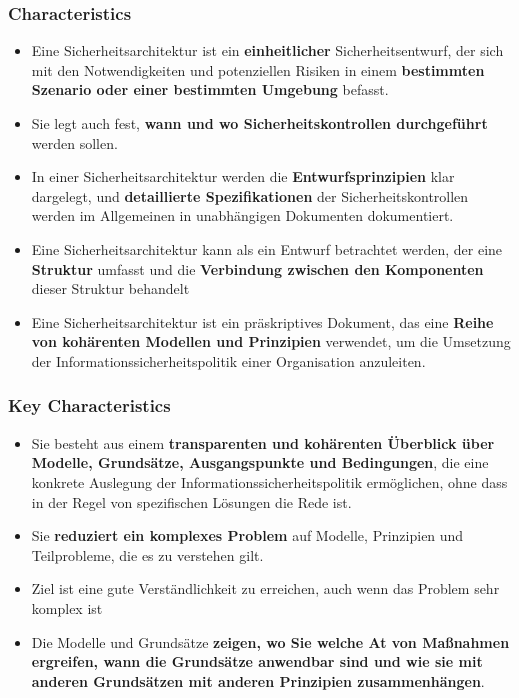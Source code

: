 \subsubsection{Characteristics}
\begin{itemize}
    \item Eine Sicherheitsarchitektur ist ein \textbf{einheitlicher} Sicherheitsentwurf, der sich mit den Notwendigkeiten und potenziellen Risiken in einem \textbf{bestimmten Szenario oder einer bestimmten Umgebung} befasst.
    \item Sie legt auch fest, \textbf{wann und wo Sicherheitskontrollen durchgeführt} werden sollen.
    \item In einer Sicherheitsarchitektur werden die \textbf{Entwurfsprinzipien} klar dargelegt, und \textbf{detaillierte Spezifikationen} der Sicherheitskontrollen werden im Allgemeinen in unabhängigen Dokumenten dokumentiert.
    \item Eine Sicherheitsarchitektur kann als ein Entwurf betrachtet werden, der eine \textbf{Struktur} umfasst und die \textbf{Verbindung zwischen den Komponenten} dieser Struktur behandelt
    \item Eine Sicherheitsarchitektur ist ein präskriptives Dokument, das eine \textbf{Reihe von kohärenten Modellen und Prinzipien} verwendet, um die Umsetzung der Informationssicherheitspolitik einer Organisation anzuleiten.
\end{itemize}

\subsubsection{Key Characteristics}
\begin{itemize}
    \item Sie besteht aus einem \textbf{transparenten und kohärenten Überblick über Modelle, Grundsätze, Ausgangspunkte und Bedingungen}, die eine konkrete Auslegung der Informationssicherheitspolitik ermöglichen, ohne dass in der Regel von spezifischen Lösungen die Rede ist.
    \item Sie \textbf{reduziert ein komplexes Problem} auf Modelle, Prinzipien und Teilprobleme, die es zu verstehen gilt.
    \item Ziel ist eine gute Verständlichkeit zu erreichen, auch wenn das Problem sehr komplex ist
    \item Die Modelle und Grundsätze \textbf{zeigen, wo Sie welche At von Maßnahmen ergreifen, wann die Grundsätze anwendbar sind und wie sie mit anderen Grundsätzen mit anderen Prinzipien zusammenhängen}.
\end{itemize}

